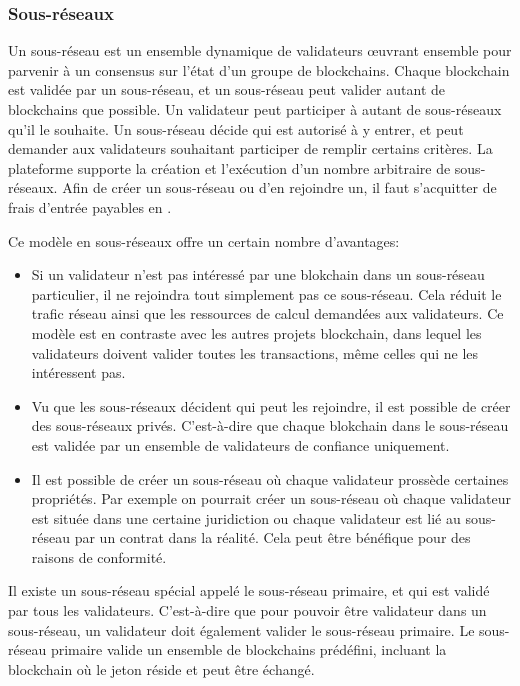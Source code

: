 \documentclass[runningheads,francais,a4paper]{llncs}
\begin{document}
\subsubsection{Sous-réseaux}
Un sous-réseau est un ensemble dynamique de validateurs œuvrant ensemble pour parvenir à un consensus sur l'état d'un
groupe de blockchains. Chaque blockchain est validée par un sous-réseau, et un sous-réseau peut valider autant de
blockchains que possible. Un validateur peut participer à autant de sous-réseaux qu'il le souhaite. Un sous-réseau
décide qui est autorisé à y entrer, et peut demander aux validateurs souhaitant participer de remplir certains
critères. La plateforme \AVAPlatformName{} supporte la création et l'exécution d'un nombre arbitraire de sous-réseaux.
Afin de créer un sous-réseau ou d'en rejoindre un, il faut s'acquitter de frais d'entrée payables en \AVATokenName{}.

Ce modèle en sous-réseaux offre un certain nombre d'avantages:
\begin{itemize}
\item Si un validateur n'est pas intéressé par une blokchain dans un sous-réseau particulier, il ne rejoindra tout
simplement pas ce sous-réseau. Cela réduit le trafic réseau ainsi que les ressources de calcul demandées aux validateurs.
Ce modèle est en contraste avec les autres projets blockchain, dans lequel les validateurs doivent valider toutes les
transactions, même celles qui ne les intéressent pas.
\item Vu que les sous-réseaux décident qui peut les rejoindre, il est possible de créer des sous-réseaux privés.
C'est-à-dire que chaque blokchain dans le sous-réseau est validée par un ensemble de validateurs de confiance uniquement.
\item Il est possible de créer un sous-réseau où chaque validateur prossède certaines propriétés. Par exemple on pourrait
créer un sous-réseau où chaque validateur est située dans une certaine juridiction ou chaque validateur est lié au
sous-réseau par un contrat dans la réalité. Cela peut être bénéfique pour des raisons de conformité.
\end{itemize}

Il existe un sous-réseau spécial appelé le sous-réseau primaire, et qui est validé par tous les validateurs.
C'est-à-dire que pour pouvoir être validateur dans un sous-réseau, un validateur doit également valider le sous-réseau
primaire. Le sous-réseau primaire valide un ensemble de blockchains prédéfini, incluant la blockchain où le jeton
\AVATokenName{} réside et peut être échangé.
\end{document}
